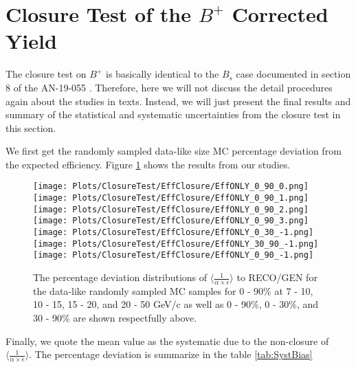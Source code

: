 \section{Closure Test of the $B^{+}$ Corrected Yield}
\label{sec:closuretest}

The closure test on $B^+$ is basically identical to the $B_s$ case documented in section 8 of the AN-19-055 \cite{AN-19-055}. Therefore, here we will not discuss the detail procedures again about the studies in texts. Instead, we will just present the final results and summary of the statistical and systematic uncertainties from the closure test in this section.


We first get the randomly sampled data-like size MC percentage deviation from the expected efficiency. Figure \ref{fig:LowStatClosure} shows the results from our studies.

\begin{figure}[h]
\begin{center}
\texttt{[image: Plots/ClosureTest/EffClosure/EffONLY\_0\_90\_0.png]}
\texttt{[image: Plots/ClosureTest/EffClosure/EffONLY\_0\_90\_1.png]}
\texttt{[image: Plots/ClosureTest/EffClosure/EffONLY\_0\_90\_2.png]}
\texttt{[image: Plots/ClosureTest/EffClosure/EffONLY\_0\_90\_3.png]}
\texttt{[image: Plots/ClosureTest/EffClosure/EffONLY\_0\_30\_-1.png]}
\texttt{[image: Plots/ClosureTest/EffClosure/EffONLY\_30\_90\_-1.png]}
\texttt{[image: Plots/ClosureTest/EffClosure/EffONLY\_0\_90\_-1.png]} 
 
\caption{The percentage deviation distributions of $\langle \frac{1}{\alpha \times \epsilon}\rangle$ to RECO/GEN for the data-like randomly sampled MC samples for 0 - 90\% at 7 - 10, 10 - 15, 15 - 20, and 20 - 50 GeV/c as well as 0 - 90\%, 0 - 30\%, and 30 - 90\% are shown respectfully above.} 
\label{fig:LowStatClosure} 
\end{center}
\end{figure}
\clearpage

Finally, we quote the mean value as the systematic due to the non-closure of $\langle \frac{1}{\alpha \times \epsilon}\rangle$. The percentage deviation is summarize in the table \ref{tab:SystBias}


